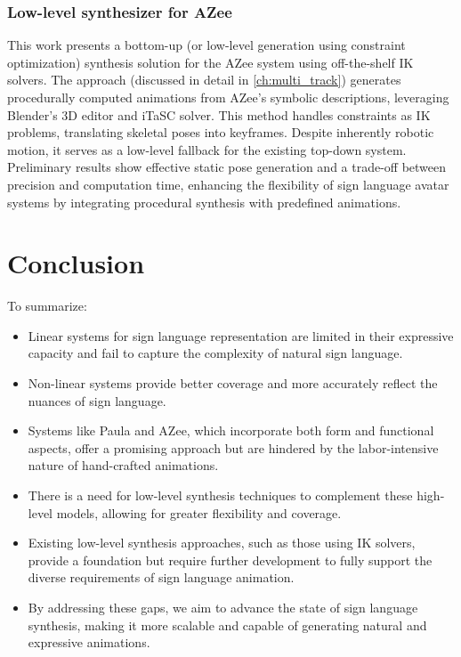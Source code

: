 \documentclass[../../main.tex]{subfiles}
\begin{document}
\subsubsection{Low-level synthesizer for AZee}
\label{subsubsec:low_level_synthesizer_for_azee}

This work presents a bottom-up (or low-level generation using constraint optimization) synthesis solution for the AZee system using off-the-shelf IK solvers. The approach (discussed in detail in \ref{ch:multi_track}) generates procedurally computed animations from AZee's symbolic descriptions, leveraging Blender's 3D editor and iTaSC solver. This method handles constraints as IK problems, translating skeletal poses into keyframes. Despite inherently robotic motion, it serves as a low-level fallback for the existing top-down system. Preliminary results show effective static pose generation and a trade-off between precision and computation time, enhancing the flexibility of sign language avatar systems by integrating procedural synthesis with predefined animations.

\section{Conclusion}
\label{sec:conclusion}

To summarize:

\begin{itemize} 
  \item Linear systems for sign language representation are limited in their expressive capacity and fail to capture the complexity of natural sign language.
  \item Non-linear systems provide better coverage and more accurately reflect the nuances of sign language.
  \item Systems like Paula and AZee, which incorporate both form and functional aspects, offer a promising approach but are hindered by the labor-intensive nature of hand-crafted animations.
  \item There is a need for low-level synthesis techniques to complement these high-level models, allowing for greater flexibility and coverage.
  \item Existing low-level synthesis approaches, such as those using IK solvers, provide a foundation but require further development to fully support the diverse requirements of sign language animation.
  \item By addressing these gaps, we aim to advance the state of sign language synthesis, making it more scalable and capable of generating natural and expressive animations.
\end{itemize}
\end{document}
